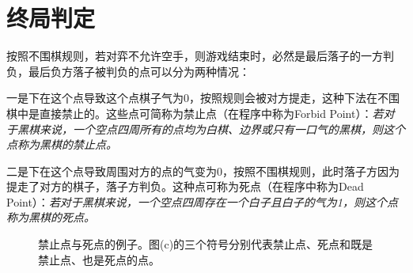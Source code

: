 \documentclass[twocolumn]{article}
\begin{document}
\section{终局判定}
按照不围棋规则，若对弈不允许空手，则游戏结束时，必然是最后落子的一方判负，最后负方落子被判负的点可以分为两种情况：
\par
一是下在这个点导致这个点棋子气为0，按照规则会被对方提走，这种下法在不围棋中是直接禁止的。这些点可简称为禁止点（在程序中称为Forbid Point）：{\it 若对于黑棋来说，一个空点四周所有的点均为白棋、边界或只有一口气的黑棋，则这个点称为黑棋的禁止点。}
\par 
二是下在这个点导致周围对方的点的气变为0，按照不围棋规则，此时落子方因为提走了对方的棋子，落子方判负。这种点可称为死点（在程序中称为Dead Point）：{\it 若对于黑棋来说，一个空点四周存在一个白子且白子的气为1，则这个点称为黑棋的死点。}

\begin{figure}[H]
\caption{禁止点与死点的例子。图(c)的三个符号分别代表禁止点、死点和既是禁止点、也是死点的点。}
\end{figure}
\end{document}
